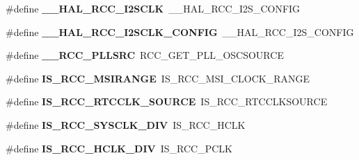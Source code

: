 \begin{DoxyCompactItemize}
\item 
\#define {\bfseries \+\_\+\+\_\+\+H\+A\+L\+\_\+\+R\+C\+C\+\_\+\+I2\+S\+C\+LK}~\+\_\+\+\_\+\+H\+A\+L\+\_\+\+R\+C\+C\+\_\+\+I2\+S\+\_\+\+C\+O\+N\+F\+IG\hypertarget{group___h_a_l___r_c_c___aliased_ga6b96f4a2f2c7dc9219b24883e8bea223}{}\label{group___h_a_l___r_c_c___aliased_ga6b96f4a2f2c7dc9219b24883e8bea223}

\item 
\#define {\bfseries \+\_\+\+\_\+\+H\+A\+L\+\_\+\+R\+C\+C\+\_\+\+I2\+S\+C\+L\+K\+\_\+\+C\+O\+N\+F\+IG}~\+\_\+\+\_\+\+H\+A\+L\+\_\+\+R\+C\+C\+\_\+\+I2\+S\+\_\+\+C\+O\+N\+F\+IG\hypertarget{group___h_a_l___r_c_c___aliased_gadc772f9067a6f4591305fe7dc0603447}{}\label{group___h_a_l___r_c_c___aliased_gadc772f9067a6f4591305fe7dc0603447}

\item 
\#define {\bfseries \+\_\+\+\_\+\+R\+C\+C\+\_\+\+P\+L\+L\+S\+RC}~R\+C\+C\+\_\+\+G\+E\+T\+\_\+\+P\+L\+L\+\_\+\+O\+S\+C\+S\+O\+U\+R\+CE\hypertarget{group___h_a_l___r_c_c___aliased_ga181e9fea5e2a50d09d2b32f5ebf78794}{}\label{group___h_a_l___r_c_c___aliased_ga181e9fea5e2a50d09d2b32f5ebf78794}

\item 
\#define {\bfseries I\+S\+\_\+\+R\+C\+C\+\_\+\+M\+S\+I\+R\+A\+N\+GE}~I\+S\+\_\+\+R\+C\+C\+\_\+\+M\+S\+I\+\_\+\+C\+L\+O\+C\+K\+\_\+\+R\+A\+N\+GE\hypertarget{group___h_a_l___r_c_c___aliased_gad3f63ae7a859b8f5395aaf703ac72694}{}\label{group___h_a_l___r_c_c___aliased_gad3f63ae7a859b8f5395aaf703ac72694}

\item 
\#define {\bfseries I\+S\+\_\+\+R\+C\+C\+\_\+\+R\+T\+C\+C\+L\+K\+\_\+\+S\+O\+U\+R\+CE}~I\+S\+\_\+\+R\+C\+C\+\_\+\+R\+T\+C\+C\+L\+K\+S\+O\+U\+R\+CE\hypertarget{group___h_a_l___r_c_c___aliased_gafbf1d14cdfb90a3da2148a8b398fae50}{}\label{group___h_a_l___r_c_c___aliased_gafbf1d14cdfb90a3da2148a8b398fae50}

\item 
\#define {\bfseries I\+S\+\_\+\+R\+C\+C\+\_\+\+S\+Y\+S\+C\+L\+K\+\_\+\+D\+IV}~I\+S\+\_\+\+R\+C\+C\+\_\+\+H\+C\+LK\hypertarget{group___h_a_l___r_c_c___aliased_ga43366c08676a120c9c7ec17169183054}{}\label{group___h_a_l___r_c_c___aliased_ga43366c08676a120c9c7ec17169183054}

\item 
\#define {\bfseries I\+S\+\_\+\+R\+C\+C\+\_\+\+H\+C\+L\+K\+\_\+\+D\+IV}~I\+S\+\_\+\+R\+C\+C\+\_\+\+P\+C\+LK\hypertarget{group___h_a_l___r_c_c___aliased_ga10acdfe634bde9d8591127e09c290178}{}\label{group___h_a_l___r_c_c___aliased_ga10acdfe634bde9d8591127e09c290178}


\end{DoxyCompactItemize}

